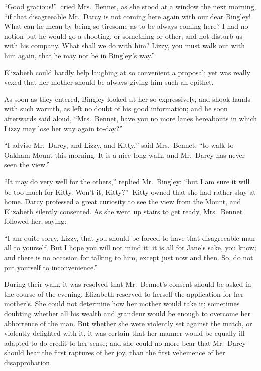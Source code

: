 \documentclass[12pt,english,oneside]{book}
\begin{document}
\bigskip{} {}``Good gracious!''\ cried Mrs.\ Bennet, as she stood
at a window the next morning, {}``if that disagreeable Mr.\ Darcy
is not coming here again with our dear Bingley! What can he mean by
being so tiresome as to be always coming here? I had no notion but
he would go a-shooting, or something or other, and not disturb us
with his company. What shall we do with him? Lizzy, you must walk
out with him again, that he may not be in Bingley's way.''

Elizabeth could hardly help laughing at so convenient a proposal;
yet was really vexed that her mother should be always giving him such
an epithet.

As soon as they entered, Bingley looked at her so expressively, and
shook hands with such warmth, as left no doubt of his good information;
and he soon afterwards said aloud, {}``Mrs.\ Bennet, have you no
more lanes hereabouts in which Lizzy may lose her way again to-day?''\


{}``I advise Mr.\ Darcy, and Lizzy, and Kitty,'' said Mrs.\ Bennet,
{}``to walk to Oakham Mount this morning. It is a nice long walk,
and Mr.\ Darcy has never seen the view.''

{}``It may do very well for the others,'' replied Mr.\ Bingley;
{}``but I am sure it will be too much for Kitty. Won't it, Kitty?''\
Kitty owned that she had rather stay at home. Darcy professed a great
curiosity to see the view from the Mount, and Elizabeth silently consented.
As she went up stairs to get ready, Mrs.\ Bennet followed her, saying:

{}``I am quite sorry, Lizzy, that you should be forced to have that
disagreeable man all to yourself. But I hope you will not mind it:
it is all for Jane's sake, you know; and there is no occasion for
talking to him, except just now and then. So, do not put yourself
to inconvenience.''

During their walk, it was resolved that Mr.\ Bennet's consent should
be asked in the course of the evening. Elizabeth reserved to herself
the application for her mother's. She could not determine how her
mother would take it; sometimes doubting whether all his wealth and
grandeur would be enough to overcome her abhorrence of the man. But
whether she were violently set against the match, or violently delighted
with it, it was certain that her manner would be equally ill adapted
to do credit to her sense; and she could no more bear that Mr.\ Darcy
should hear the first raptures of her joy, than the first vehemence
of her disapprobation.
\end{document}
